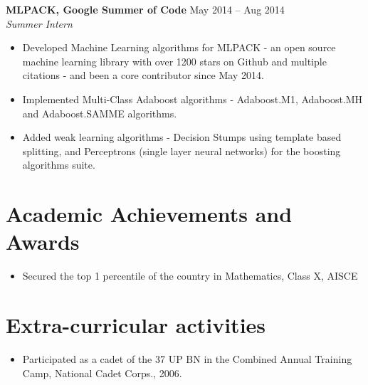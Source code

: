 \documentclass[letterpaper]{article}
\begin{document}
\vspace{-0.6mm}

\textbf{MLPACK, Google Summer of Code} \hfill May 2014 -- Aug 2014\\
\emph{Summer Intern}\\
\vspace{-6mm}
\begin{itemize}
\item Developed Machine Learning algorithms for MLPACK - an open source machine learning library with over 1200 stars on Github and multiple citations - and been a core contributor since May 2014.
\vspace{-2mm}
\item Implemented Multi-Class Adaboost algorithms - Adaboost.M1, Adaboost.MH and Adaboost.SAMME algorithms.
\vspace{-2mm}
\item Added weak learning algorithms - Decision Stumps using template based splitting, and Perceptrons (single layer neural networks) for the boosting algorithms suite.
\end{itemize}

\section*{Academic Achievements and Awards}
\begin{itemize}
\item Secured the top 1 percentile of the country in Mathematics, Class X, AISCE
\end{itemize}

\section*{Extra-curricular activities}
\begin{itemize}
\item Participated as a cadet of the 37 UP BN in the Combined Annual Training Camp, National Cadet Corps., 2006.
\end{itemize}
\end{document}
